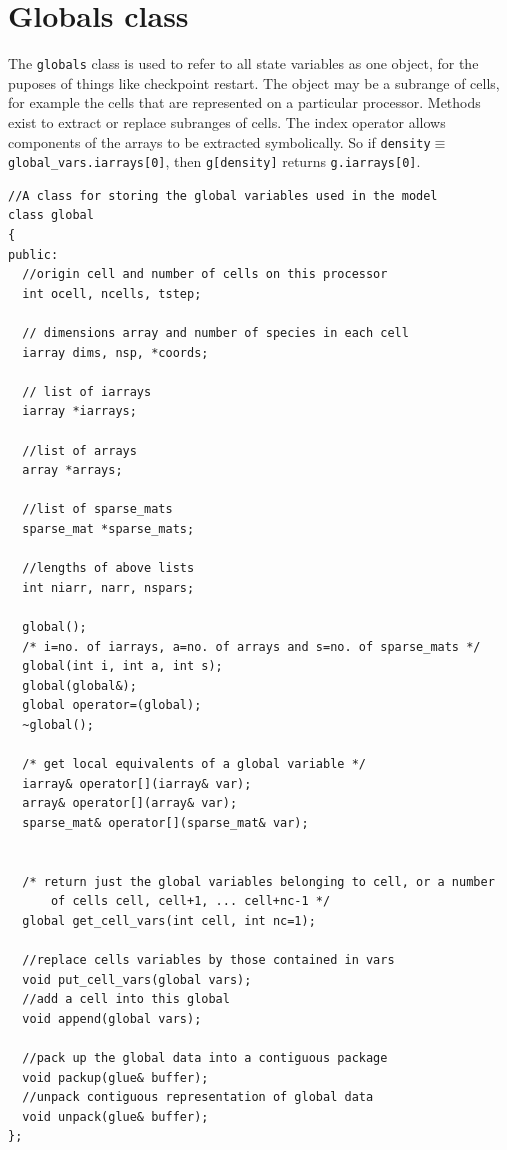 \section{Globals class}

The {\tt globals} class is used to refer to all state variables as one
object, for the puposes of things like checkpoint restart. The object
may be a subrange of cells, for example the cells that are represented
on a particular processor. Methods exist to extract or replace
subranges of cells. The index operator allows components of the arrays
to be extracted symbolically. So if {\tt density}$\equiv${\tt
  global\_vars.iarrays[0]}, then {\tt g[density]} returns {\tt g.iarrays[0]}.

\begin{verbatim}
//A class for storing the global variables used in the model
class global
{
public:
  //origin cell and number of cells on this processor 
  int ocell, ncells, tstep; 

  // dimensions array and number of species in each cell
  iarray dims, nsp, *coords;  

  // list of iarrays
  iarray *iarrays;

  //list of arrays
  array *arrays;

  //list of sparse_mats
  sparse_mat *sparse_mats;

  //lengths of above lists
  int niarr, narr, nspars;

  global(); 
  /* i=no. of iarrays, a=no. of arrays and s=no. of sparse_mats */
  global(int i, int a, int s);
  global(global&); 
  global operator=(global);
  ~global();

  /* get local equivalents of a global variable */
  iarray& operator[](iarray& var); 
  array& operator[](array& var);
  sparse_mat& operator[](sparse_mat& var);
  

  /* return just the global variables belonging to cell, or a number
      of cells cell, cell+1, ... cell+nc-1 */
  global get_cell_vars(int cell, int nc=1);
 
  //replace cells variables by those contained in vars
  void put_cell_vars(global vars);
  //add a cell into this global
  void append(global vars);

  //pack up the global data into a contiguous package
  void packup(glue& buffer);
  //unpack contiguous representation of global data
  void unpack(glue& buffer);
};

\end{verbatim}


